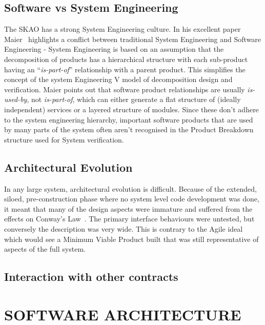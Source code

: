 \documentclass[a4paper,
               biblatex,     %
               keeplastbox,   %
               ]{jacow}
\begin{document}
\subsection{Software vs System Engineering}
The SKAO has a strong System Engineering culture. In his excellent paper Maier~\cite{Maier2006} highlights a conflict between traditional System Engineering and Software Engineering - System Engineering is based on an assumption that the decomposition of products has a hierarchical structure with each sub-product having an ``{\em is-part-of}'' relationship with a parent product. This simplifies the concept of the system Engineering V model of decomposition design and verification. Maier points out that software product relationships are usually {\em is-used-by}, not {\em is-part-of}, which can either generate a flat structure of (ideally independent) services or a layered structure of modules. Since these don't adhere to the system engineering hierarchy, important software products that are used by many parts of the system often aren't recognised in the Product Breakdown structure used for System verification.

\subsection{Architectural Evolution}
In any large system, architectural evolution is difficult. Because of the extended, siloed, pre-construction phase where no system level code development was done, it meant that many of the design aspects were immature and suffered from the effects on Conway's Law~\cite{Conway}. The primary interface behaviours were untested, but conversely the description was very wide. This is contrary to the Agile ideal which would see a Minimum Viable Product built that was still representative of aspects of the full system. 

\subsection{Interaction with other contracts}

\section{SOFTWARE ARCHITECTURE}

\end{document}
